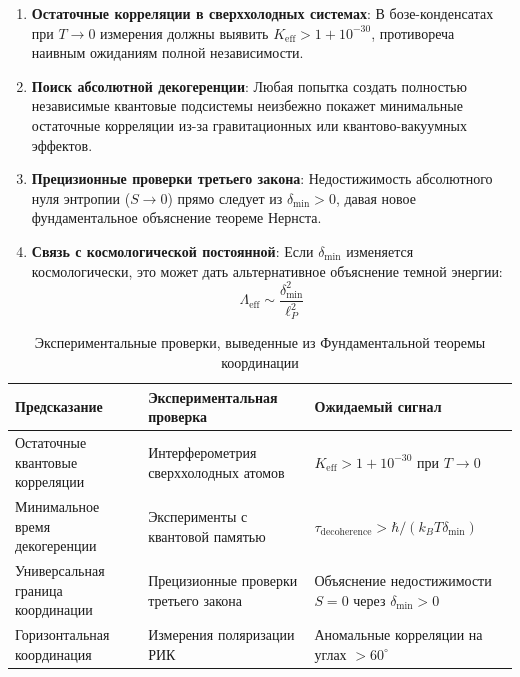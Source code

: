 \documentclass[11pt,a4paper]{article}
\begin{document}
	\begin{enumerate}
		\item \textbf{Остаточные корреляции в сверххолодных системах}: В бозе-конденсатах при $T \to 0$ измерения должны выявить $K_{\mathrm{eff}} > 1 + 10^{-30}$, противореча наивным ожиданиям полной независимости.
		
		\item \textbf{Поиск абсолютной декогеренции}: Любая попытка создать полностью независимые квантовые подсистемы неизбежно покажет минимальные остаточные корреляции из-за гравитационных или квантово-вакуумных эффектов.
		
		\item \textbf{Прецизионные проверки третьего закона}: Недостижимость абсолютного нуля энтропии ($S \to 0$) прямо следует из $\delta_{\min} > 0$, давая новое фундаментальное объяснение теореме Нернста.
		
		\item \textbf{Связь с космологической постоянной}: Если $\delta_{\min}$ изменяется космологически, это может дать альтернативное объяснение темной энергии:
		\begin{equation}
			\Lambda_{\mathrm{eff}} \sim \frac{\delta_{\min}^2}{\ell_P^2}
		\end{equation}
	\end{enumerate}
	
	\begin{table}[htbp]
		\centering
		\small
		\begin{tabular}{p{}p{}p{}}
			\toprule
			\textbf{Предсказание} & \textbf{Экспериментальная проверка} & \textbf{Ожидаемый сигнал} \\
			\midrule
			Остаточные квантовые корреляции & Интерферометрия сверххолодных атомов & $K_{\mathrm{eff}} > 1 + 10^{-30}$ при $T \to 0$ \\
			Минимальное время декогеренции & Эксперименты с квантовой памятью & $\tau_{\text{decoherence}} > \hbar/(k_B T \delta_{\min})$ \\
			Универсальная граница координации & Прецизионные проверки третьего закона & Объяснение недостижимости $S=0$ через $\delta_{\min}>0$ \\
			Горизонтальная координация & Измерения поляризации РИК & Аномальные корреляции на углах $>60^\circ$ \\
			\bottomrule
		\end{tabular}
		\caption{Экспериментальные проверки, выведенные из Фундаментальной теоремы координации}
		\label{tab:theorem-predictions}
	\end{table}
	
\end{document}
